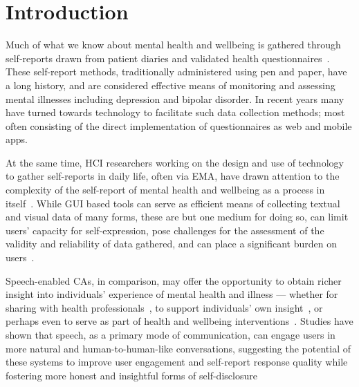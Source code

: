 \section{Introduction}

    Much of what we know about mental health and wellbeing is gathered through self-reports drawn from patient diaries and validated health questionnaires~\cite{arean2016mobile, doherty2020design, doherty2018engagement}. These self-report methods, traditionally administered using pen and paper, have a long history, and are considered effective means of monitoring and assessing mental illnesses including depression and bipolar disorder. In recent years many have turned towards technology to facilitate such data collection methods; most often consisting of the direct implementation of questionnaires as web and mobile apps.
    
    At the same time, \ac{HCI} researchers working on the design and use of technology to gather self-reports in daily life, often via \ac{EMA}, have drawn attention to the complexity of the self-report of mental health and wellbeing as a process in itself~\cite{rohani2020mubs, bardram2013designing, doherty2019engagement}. While \ac{GUI} based tools can serve as efficient means of collecting textual and visual data of many forms, these are but one medium for doing so, can limit users' capacity for self-expression, pose challenges for the assessment of the validity and reliability of data gathered, and can place a significant burden on users~\cite{harari2016using, van2017experience, doherty2020design}.
    
    Speech-enabled \ac{CA}s, in comparison, may offer the opportunity to obtain richer insight into individuals' experience of mental health and illness --- whether for sharing with health professionals~\cite{pradhan2018accessibility}, to support individuals' own insight~\cite{lucas2014s}, or perhaps even to serve as part of health and wellbeing interventions~\cite{wang2020alexa, duffy2021attitudes}. Studies have shown that speech, as a primary mode of communication, can engage users in more natural and human-to-human-like conversations, suggesting the potential of these systems to improve user engagement and self-report response quality while fostering more honest and insightful forms of self-disclosure~\cite{devault2014simsensei, lucas2014s} 
    
